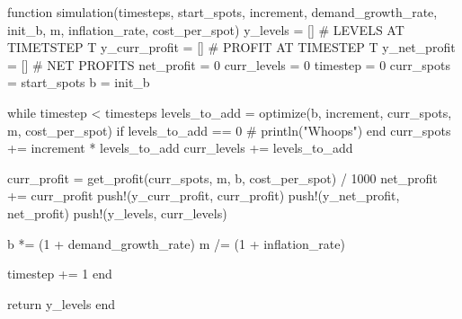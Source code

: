 \documentclass[
  11pt,
]{article}
\newenvironment{Shaded}{\begin{snugshade}}{\end{snugshade}}
\newcommand{\CommentTok}[1]{\textcolor[rgb]{0.37,0.37,0.37}{#1}}
\newcommand{\ControlFlowTok}[1]{\textcolor[rgb]{0.00,0.23,0.31}{#1}}
\newcommand{\FloatTok}[1]{\textcolor[rgb]{0.68,0.00,0.00}{#1}}
\newcommand{\FunctionTok}[1]{\textcolor[rgb]{0.28,0.35,0.67}{#1}}
\newcommand{\KeywordTok}[1]{\textcolor[rgb]{0.00,0.23,0.31}{#1}}
\newcommand{\NormalTok}[1]{\textcolor[rgb]{0.00,0.23,0.31}{#1}}
\newcommand{\OperatorTok}[1]{\textcolor[rgb]{0.37,0.37,0.37}{#1}}
\begin{document}
\begin{Shaded}
\begin{Highlighting}[numbers=left,,]
\KeywordTok{function} \FunctionTok{simulation}\NormalTok{(timesteps, start\_spots, increment, demand\_growth\_rate, init\_b, m, inflation\_rate, cost\_per\_spot)}
\NormalTok{    y\_levels }\OperatorTok{=}\NormalTok{ [] }\CommentTok{\# LEVELS AT TIMETSTEP T}
\NormalTok{    y\_curr\_profit }\OperatorTok{=}\NormalTok{ [] }\CommentTok{\# PROFIT AT TIMESTEP T}
\NormalTok{    y\_net\_profit }\OperatorTok{=}\NormalTok{ [] }\CommentTok{\# NET PROFITS}
\NormalTok{    net\_profit }\OperatorTok{=} \FloatTok{0}
\NormalTok{    curr\_levels }\OperatorTok{=} \FloatTok{0}
\NormalTok{    timestep }\OperatorTok{=} \FloatTok{0}
\NormalTok{    curr\_spots }\OperatorTok{=}\NormalTok{ start\_spots}
\NormalTok{    b }\OperatorTok{=}\NormalTok{ init\_b}

    \ControlFlowTok{while}\NormalTok{ timestep }\OperatorTok{\textless{}}\NormalTok{ timesteps}
\NormalTok{        levels\_to\_add }\OperatorTok{=} \FunctionTok{optimize}\NormalTok{(b, increment, curr\_spots, m, cost\_per\_spot)}
        \ControlFlowTok{if}\NormalTok{ levels\_to\_add }\OperatorTok{==} \FloatTok{0}
            \CommentTok{\# println("Whoops")}
        \ControlFlowTok{end}
\NormalTok{        curr\_spots }\OperatorTok{+=}\NormalTok{ increment }\OperatorTok{*}\NormalTok{ levels\_to\_add}
\NormalTok{        curr\_levels }\OperatorTok{+=}\NormalTok{ levels\_to\_add}

\NormalTok{        curr\_profit }\OperatorTok{=} \FunctionTok{get\_profit}\NormalTok{(curr\_spots, m, b, cost\_per\_spot) }\OperatorTok{/} \FloatTok{1000}
\NormalTok{        net\_profit }\OperatorTok{+=}\NormalTok{ curr\_profit}
        \FunctionTok{push!}\NormalTok{(y\_curr\_profit, curr\_profit)}
        \FunctionTok{push!}\NormalTok{(y\_net\_profit, net\_profit)}
        \FunctionTok{push!}\NormalTok{(y\_levels, curr\_levels)}

\NormalTok{        b }\OperatorTok{*=}\NormalTok{ (}\FloatTok{1} \OperatorTok{+}\NormalTok{ demand\_growth\_rate)}
\NormalTok{        m }\OperatorTok{/=}\NormalTok{ (}\FloatTok{1} \OperatorTok{+}\NormalTok{ inflation\_rate)}

\NormalTok{        timestep }\OperatorTok{+=} \FloatTok{1} 
    \ControlFlowTok{end}

    \ControlFlowTok{return}\NormalTok{ y\_levels}
\KeywordTok{end}
\end{Highlighting}
\end{Shaded}
\end{document}
